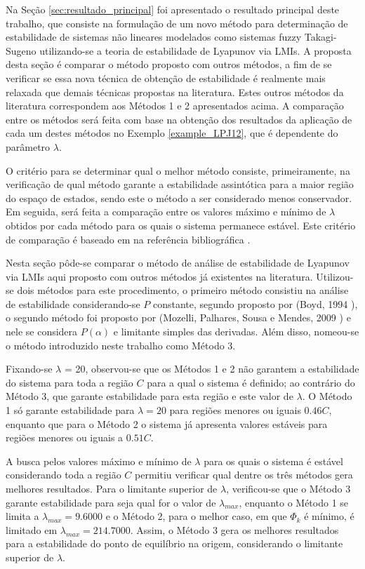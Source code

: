 Na Seção \ref{sec:resultado_principal} foi apresentado o resultado principal deste trabalho, que consiste na formulação de um novo método para determinação de estabilidade de sistemas não lineares modelados como sistemas fuzzy Takagi-Sugeno utilizando-se a teoria de estabilidade de Lyapunov via LMIs. A proposta desta seção é comparar o método proposto com outros métodos, a fim de se verificar se essa nova técnica de obtenção de estabilidade é realmente mais relaxada que demais técnicas propostas na literatura. Estes outros métodos da literatura correspondem aos Métodos 1 e 2 apresentados acima. A comparação entre os métodos será feita com base na obtenção dos resultados da aplicação de cada um destes métodos no Exemplo \ref{example_LPJ12}, que é dependente do parâmetro $\lambda$. 

O critério para se determinar qual o melhor método consiste, primeiramente, na verificação de qual método garante a estabilidade assintótica para a maior região do espaço de estados, sendo este o método a ser considerado menos conservador. Em seguida, será feita a comparação  entre os valores máximo e mínimo de $\lambda$ obtidos por cada método para os quais o sistema permanece estável. Este critério de comparação é baseado em na referência bibliográfica \cite{MPSM:2009}.


Nesta seção pôde-se comparar o método de análise de estabilidade de Lyapunov via LMIs aqui proposto com outros métodos já existentes na literatura. Utilizou-se dois métodos para este procedimento, o primeiro método consistiu na análise de estabilidade considerando-se $P$ constante, segundo proposto por (Boyd, 1994 \cite{bookboydl:1994}), o segundo método foi proposto por (Mozelli, Palhares, Sousa e Mendes, 2009 \cite{MPSM:2009}) e nele se considera $P(\alpha)$ e limitante simples das derivadas. Além disso, nomeou-se o método introduzido neste trabalho como Método 3.

Fixando-se $\lambda$ = 20, observou-se que os Métodos 1 e 2 não garantem a estabilidade do sistema para toda a região $C$ para a qual o sistema é definido; ao contrário do Método 3, que garante estabilidade para esta região e este valor de $\lambda$. O Método 1 só garante estabilidade para $\lambda = 20$ para regiões menores ou iguais $0.46C$, enquanto que para o Método 2 o sistema já apresenta valores estáveis para regiões menores ou iguais a $0.51C$.

A busca pelos valores máximo e mínimo de $\lambda$ para os quais o sistema é estável considerando toda a região $C$ permitiu verificar qual dentre os três métodos gera melhores resultados. Para o limitante superior de $\lambda$, verificou-se que o Método 3 garante estabilidade para seja qual for o valor de $\lambda_{max}$, enquanto o Método 1 se limita a $\lambda_{max} = 9.6000$ e o Método 2, para o melhor caso, em que $\Phi_k$ é mínimo, é limitado em $\lambda_{max} = 214.7000$. Assim, o Método 3 gera os melhores resultados para a estabilidade do ponto de equilíbrio na origem, considerando o limitante superior de $\lambda$.


